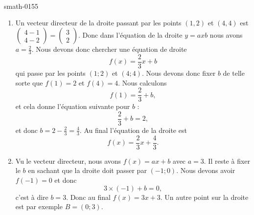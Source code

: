 
\begin{corrige}{smath-0155}

    \begin{enumerate}
        \item
            Un vecteur directeur de la droite passant par les points $(1,2)$ et $(4,4)$ est \( \begin{pmatrix}
                4-1    \\ 
                4-2    
            \end{pmatrix}=\begin{pmatrix}
                3    \\ 
                2    
            \end{pmatrix}\). Donc dans l'équation de la droite \( y=axb\) nous avons \( a=\frac{ 2 }{ 3 }\). Nous devons donc chercher une équation de droite 
            \begin{equation}
                f(x)=\frac{ 2 }{ 3 }x+b
            \end{equation}
            qui passe par les points \( (1;2)\) et \( (4;4)\). Nous devons donc fixer \( b\) de telle sorte que \( f(1)=2\) et \( f(4)=4\). Nous calculons
            \begin{equation}
                f(1)=\frac{ 2 }{ 3 }+b,
            \end{equation}
            et cela donne l'équation suivante pour \( b\) :
            \begin{equation}
                \frac{ 2 }{ 3 }+b=2,
            \end{equation}
            et donc \( b=2-\frac{ 2 }{ 3 }=\frac{ 4 }{ 3 }\). Au final l'équation de la droite est
            \begin{equation}
                f(x)=\frac{ 2 }{ 3 }x+\frac{ 4 }{ 3 }.
            \end{equation}
        \item
            Vu le vecteur directeur, nous avons \( f(x)=ax+b\) avec \( a=3\). Il reste à fixer le \( b\) en sachant que la droite doit passer par \( (-1;0)\). Nous devons avoir \( f(-1)=0\) et donc
            \begin{equation}
                3\times (-1)+b=0,
            \end{equation}
            c'est à dire \( b=3\). Donc au final \( f(x)=3x+3\). Un autre point sur la droite est par exemple \( B=(0;3)\).
            
    \end{enumerate}

\end{corrige}
